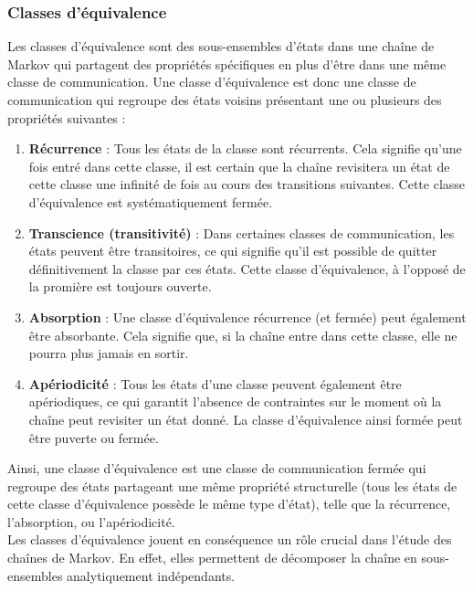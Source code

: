 \documentclass{article}
\begin{document}
\subsubsection{Classes d'équivalence}

Les classes d'équivalence sont des sous-ensembles d'états dans une chaîne de Markov qui partagent des propriétés spécifiques en plus d'être dans une même classe de communication. Une classe d'équivalence est donc une classe de communication qui regroupe des états voisins présentant une ou plusieurs des propriétés suivantes :

\begin{enumerate}
\item \textbf{Récurrence} : Tous les états de la classe sont récurrents. Cela signifie qu'une fois entré dans cette classe, il est certain que la chaîne revisitera un état de cette classe une infinité de fois au cours des transitions suivantes. Cette classe d'équivalence est systématiquement fermée.
\item \textbf{Transcience (transitivité)} : Dans certaines classes de communication, les états peuvent être transitoires, ce qui signifie qu'il est possible de quitter définitivement la classe par ces états. Cette classe d'équivalence, à l'opposé de la promière est toujours ouverte.
\item \textbf{Absorption} : Une classe d'équivalence récurrence (et fermée) peut également être absorbante. Cela signifie que, si la chaîne entre dans cette classe, elle ne pourra plus jamais en sortir.
\item \textbf{Apériodicité} : Tous les états d'une classe peuvent également être apériodiques, ce qui garantit l'absence de contraintes sur le moment où la chaîne peut revisiter un état donné. La classe d'équivalence ainsi formée peut être puverte ou fermée. \\
\end{enumerate}

Ainsi, une classe d'équivalence est une classe de communication fermée qui regroupe des états partageant une même propriété structurelle (tous les états de cette classe d'équivalence possède le même type d'état), telle que la récurrence, l'absorption, ou l'apériodicité. \\

Les classes d'équivalence jouent en conséquence un rôle crucial dans l'étude des chaînes de Markov. En effet, elles permettent de décomposer la chaîne en sous-ensembles analytiquement indépendants.
\end{document}
